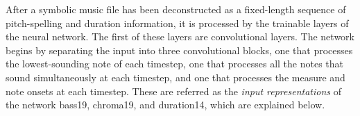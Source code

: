 
After a symbolic music file has been deconstructed as a
fixed-length sequence of pitch-spelling and duration
information, it is processed by the trainable layers of the
neural network. The first of these layers are convolutional
layers. The network begins by separating the input into
three convolutional blocks, one that processes the
lowest-sounding note of each timestep, one that processes
all the notes that sound simultaneously at each timestep,
and one that processes the measure and note onsets at each
timestep. These are referred as the \emph{input
representations} of the network \gls{bass19},
\gls{chroma19}, and \gls{duration14}, which are explained below.


